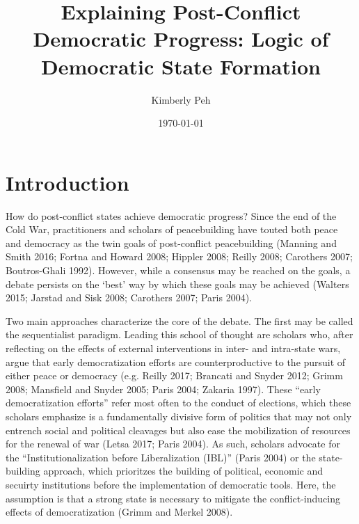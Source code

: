 \documentclass [11pt]{article}
\title{Explaining Post-Conflict Democratic Progress: Logic of Democratic State Formation}
\author{Kimberly Peh}
\date{\today}
\begin{document}
\maketitle

\section*{Introduction} 

How do post-conflict states achieve democratic progress? Since the end of the Cold War, practitioners and scholars of peacebuilding have touted both peace and democracy as the twin goals of post-conflict peacebuilding (Manning and Smith 2016; Fortna and Howard 2008; Hippler 2008; Reilly 2008; Carothers 2007; Boutros-Ghali 1992). However, while a consensus may be reached on the goals, a debate persists on the `best' way by which these goals may be achieved (Walters 2015; Jarstad and Sisk 2008; Carothers 2007; Paris 2004).

Two main approaches characterize the core of the debate. The first may be called the sequentialist paradigm. Leading this school of thought are scholars who, after reflecting on the effects of external interventions in inter- and intra-state wars, argue that early democratization efforts are counterproductive to the pursuit of either peace or democracy (e.g. Reilly 2017; Brancati and Snyder 2012; Grimm 2008; Mansfield and Snyder 2005; Paris 2004; Zakaria 1997). These ``early democratization efforts'' refer most often to the conduct of elections, which these scholars emphasize is a fundamentally divisive form of politics that may not only entrench social and political cleavages but also ease the mobilization of resources for the renewal of war (Letsa 2017; Paris 2004). As such, scholars advocate for the ``Institutionalization before Liberalization (IBL)'' (Paris 2004) or the state-building approach, which prioritzes the building of political, economic and secuirty institutions before the implementation of democratic tools. Here, the assumption is that a strong state is necessary to mitigate the conflict-inducing effects of democratization (Grimm and Merkel 2008).
\end{document}
